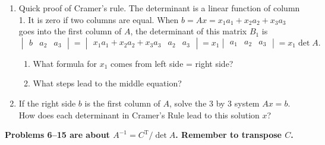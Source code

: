 \documentclass[14pt, a4paper]{article}
\begin{document}
\begin{enumerate}
    \item Quick proof of Cramer's rule. The determinant is a linear function of column 1. It is zero if two columns are equal. When $b = Ax = x_1a_1 + x_2a_2 + x_3a_3$ goes into the first column of $A$, the determinant of this matrix $B_1$ is
          \[
              \begin{vmatrix} b & a_2 & a_3 \end{vmatrix} = \begin{vmatrix} x_1a_1 + x_2a_2 + x_3a_3 & a_2 & a_3 \end{vmatrix} = x_1 \begin{vmatrix} a_1 & a_2 & a_3 \end{vmatrix} = x_1 \det A.
          \]
          \begin{enumerate}
              \item What formula for $x_1$ comes from left side = right side?
              \item What steps lead to the middle equation?
          \end{enumerate}

    \item If the right side $b$ is the first column of $A$, solve the 3 by 3 system $Ax = b$. How does each determinant in Cramer's Rule lead to this solution $x$?
\end{enumerate}

\noindent \textbf{Problems 6--15 are about $A^{-1} = C^{\text{T}} / \det A$. Remember to transpose $C$.}
\end{document}
